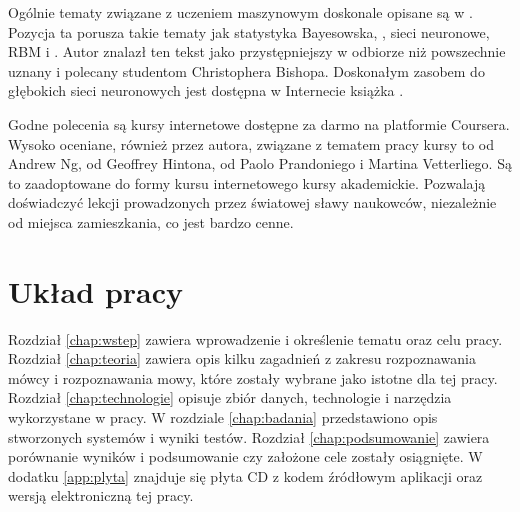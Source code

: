 Ogólnie tematy związane z uczeniem maszynowym doskonale opisane są w
\cite{patternClassification}. Pozycja ta porusza takie tematy jak statystyka Bayesowska, 
, sieci neuronowe, RBM
i . Autor znalazł ten tekst jako przystępniejszy w odbiorze niż powszechnie
uznany i polecany studentom  Christophera Bishopa.
Doskonałym zasobem do głębokich sieci neuronowych jest dostępna w Internecie książka
\cite{deeplearningbook}.

Godne polecenia są kursy internetowe dostępne za darmo na platformie Coursera.
Wysoko oceniane, również przez autora, związane z tematem pracy kursy to
 od Andrew Ng,
 od Geoffrey Hintona,
 od Paolo Prandoniego i  Martina Vetterliego.
Są to zaadoptowane do formy kursu internetowego kursy akademickie. Pozwalają
doświadczyć lekcji prowadzonych przez światowej sławy naukowców, niezależnie
od miejsca zamieszkania, co jest bardzo cenne.

\section{Układ pracy}\label{sec:uklad_pracy}

Rozdział \ref{chap:wstep} zawiera wprowadzenie i określenie tematu oraz celu
pracy. Rozdział \ref{chap:teoria} zawiera opis kilku zagadnień z zakresu
rozpoznawania mówcy i rozpoznawania mowy, które zostały wybrane jako
istotne dla tej pracy. Rozdział \ref{chap:technologie}
opisuje zbiór danych, technologie i narzędzia wykorzystane w pracy. W rozdziale
\ref{chap:badania} przedstawiono opis stworzonych systemów i wyniki testów. Rozdział
\ref{chap:podsumowanie} zawiera porównanie wyników i podsumowanie czy założone
cele zostały osiągnięte. W dodatku \ref{app:plyta} znajduje się płyta CD z
kodem źródłowym aplikacji oraz wersją elektroniczną tej pracy.

